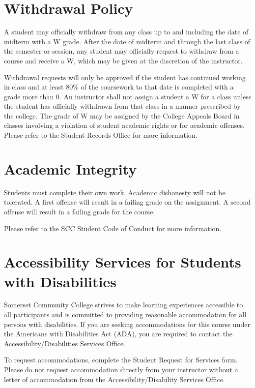 \section*{Withdrawal Policy}

A student may officially withdraw from any class up to and including the date of midterm with a W grade. After the date of midterm and through the last class of the semester or session, any student may officially request to withdraw from a course and receive a W, which may be given at the discretion of the instructor.

Withdrawal requests will only be approved if the student has continued working in class and at least 80\% of the coursework to that date is completed with a grade more than 0. An instructor shall not assign a student a W for a class unless the student has officially withdrawn from that class in a manner prescribed by the college. The grade of W may be assigned by the College Appeals Board in classes involving a violation of student academic rights or for academic offenses. Please refer to the Student Records Office for more information.


\section*{Academic Integrity}

Students must complete their own work. Academic dishonesty will not be tolerated. A first offense will result in a failing grade on the assignment. A second offense will result in a failing grade for the course.

Please refer to the SCC Student Code of Conduct for more information.

\section*{Accessibility Services for Students with Disabilities}

Somerset Community College strives to make learning experiences accessible to all participants and is committed to providing reasonable accommodation for all persons with disabilities. If you are seeking accommodations for this course under the Americans with Disabilities Act (ADA), you are required to contact the Accessibility/Disabilities Services Office.

To request accommodations, complete the Student Request for Services form. Please do not request accommodation directly from your instructor without a letter of accommodation from the Accessibility/Disability Services Office.

